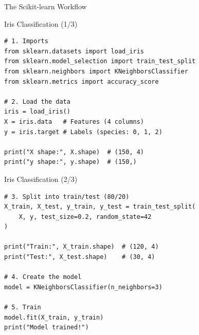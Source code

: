 \documentclass[aspectratio=169]{beamer}
\begin{document}
\begin{frame}{The Scikit-learn Workflow}
\begin{center}
\end{center}
\end{frame}

\begin{frame}[fragile]{Iris Classification (1/3)}
\begin{lstlisting}
# 1. Imports
from sklearn.datasets import load_iris
from sklearn.model_selection import train_test_split
from sklearn.neighbors import KNeighborsClassifier
from sklearn.metrics import accuracy_score

# 2. Load the data
iris = load_iris()
X = iris.data   # Features (4 columns)
y = iris.target # Labels (species: 0, 1, 2)

print("X shape:", X.shape)  # (150, 4)
print("y shape:", y.shape)  # (150,)
\end{lstlisting}
\end{frame}

\begin{frame}[fragile]{Iris Classification (2/3)}
\begin{lstlisting}
# 3. Split into train/test (80/20)
X_train, X_test, y_train, y_test = train_test_split(
    X, y, test_size=0.2, random_state=42
)

print("Train:", X_train.shape)  # (120, 4)
print("Test:", X_test.shape)    # (30, 4)

# 4. Create the model
model = KNeighborsClassifier(n_neighbors=3)

# 5. Train
model.fit(X_train, y_train)
print("Model trained!")
\end{lstlisting}
\end{frame}
\end{document}
